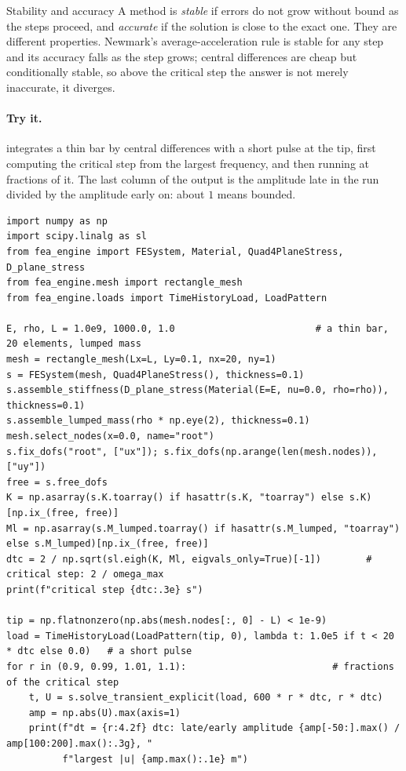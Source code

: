 \begin{sidenote}{Stability and accuracy}
A method is \emph{stable} if errors do not grow without bound as the steps proceed, and \emph{accurate} if the solution is close to the exact one. They are different properties. Newmark's average-acceleration rule is stable for any step and its accuracy falls as the step grows; central differences are cheap but conditionally stable, so above the critical step the answer is not merely inaccurate, it diverges.
\end{sidenote}

\paragraph{Try it.}  integrates a thin bar by central differences with a short pulse at the tip, first computing the critical step from the largest frequency, and then running at fractions of it. The last column of the output is the amplitude late in the run divided by the amplitude early on: about $1$ means bounded.

\begin{lstlisting}[caption={Central differences on a lumped-mass bar at fractions of the critical step (run with the package on the path).},label={lst:dy-try}]
import numpy as np
import scipy.linalg as sl
from fea_engine import FESystem, Material, Quad4PlaneStress, D_plane_stress
from fea_engine.mesh import rectangle_mesh
from fea_engine.loads import TimeHistoryLoad, LoadPattern

E, rho, L = 1.0e9, 1000.0, 1.0                         # a thin bar, 20 elements, lumped mass
mesh = rectangle_mesh(Lx=L, Ly=0.1, nx=20, ny=1)
s = FESystem(mesh, Quad4PlaneStress(), thickness=0.1)
s.assemble_stiffness(D_plane_stress(Material(E=E, nu=0.0, rho=rho)), thickness=0.1)
s.assemble_lumped_mass(rho * np.eye(2), thickness=0.1)
mesh.select_nodes(x=0.0, name="root")
s.fix_dofs("root", ["ux"]); s.fix_dofs(np.arange(len(mesh.nodes)), ["uy"])
free = s.free_dofs
K = np.asarray(s.K.toarray() if hasattr(s.K, "toarray") else s.K)[np.ix_(free, free)]
Ml = np.asarray(s.M_lumped.toarray() if hasattr(s.M_lumped, "toarray") else s.M_lumped)[np.ix_(free, free)]
dtc = 2 / np.sqrt(sl.eigh(K, Ml, eigvals_only=True)[-1])        # critical step: 2 / omega_max
print(f"critical step {dtc:.3e} s")

tip = np.flatnonzero(np.abs(mesh.nodes[:, 0] - L) < 1e-9)
load = TimeHistoryLoad(LoadPattern(tip, 0), lambda t: 1.0e5 if t < 20 * dtc else 0.0)   # a short pulse
for r in (0.9, 0.99, 1.01, 1.1):                          # fractions of the critical step
    t, U = s.solve_transient_explicit(load, 600 * r * dtc, r * dtc)
    amp = np.abs(U).max(axis=1)
    print(f"dt = {r:4.2f} dtc: late/early amplitude {amp[-50:].max() / amp[100:200].max():.3g}, "
          f"largest |u| {amp.max():.1e} m")
\end{lstlisting}

